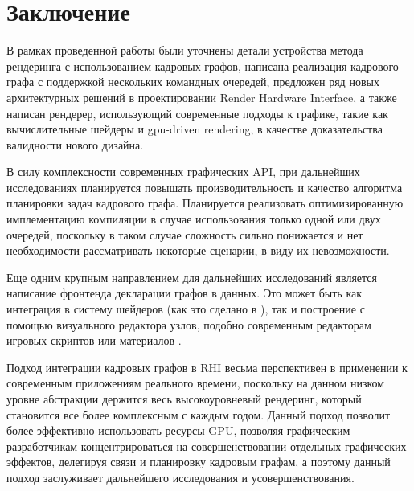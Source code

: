 \section{Заключение}
В рамках проведенной работы были уточнены детали устройства метода рендеринга с использованием кадровых графов, написана реализация кадрового графа с поддержкой нескольких командных очередей, предложен ряд новых архитектурных решений в проектировании Render Hardware Interface, а также написан рендерер, использующий современные подходы к графике, такие как вычислительные шейдеры и gpu-driven rendering, в качестве доказательства валидности нового дизайна.

В силу комплексности современных графических API, при дальнейших исследованиях планируется повышать производительность и качество алгоритма планировки задач кадрового графа. Планируется реализовать оптимизированную имплементацию компиляции в случае использования только одной или двух очередей, поскольку в таком случае сложность сильно понижается и нет необходимости рассматривать некоторые сценарии, в виду их невозможности.

Еще одним крупным направлением для дальнейших исследований является написание фронтенда декларации графов в данных. Это может быть как интеграция в систему шейдеров (как это сделано в \cite{amd_rps_sdk}), так и построение с помощью визуального редактора узлов, подобно современным редакторам игровых скриптов или материалов \cite{material_editor_ue5}.

Подход интеграции кадровых графов в RHI весьма перспективен в применении к современным приложениям реального времени, поскольку на данном низком уровне абстракции держится весь высокоуровневый рендеринг, который становится все более комплексным с каждым годом. Данный подход позволит более эффективно использовать ресурсы GPU, позволяя графическим разработчикам концентрироваться на совершенствовании отдельных графических эффектов, делегируя связи и планировку кадровым графам, а поэтому данный подход заслуживает дальнейшего исследования и усовершенствования.